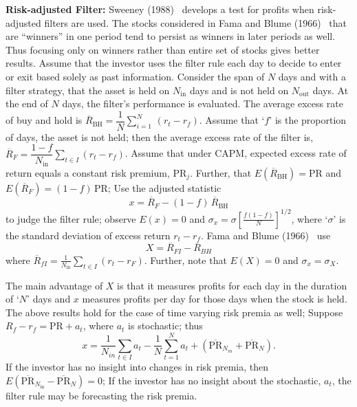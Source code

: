 \noindent \textbf{Risk-adjusted Filter:} Sweeney (1988)~\cite{sweet} develops a test for profits when risk-adjusted filters are used. The stocks considered in Fama and Blume (1966)~\cite{famablume} that are ``winners'' in one period tend to persist as winners in later periods as well. Thus focusing only on winners rather than entire set of stocks gives better results. Assume that the investor uses the filter rule each day to decide to enter or exit based solely as past information. Consider the span of $N$ days and with a filter strategy, that the asset is held on $N_{\text{in}}$ days and is not held on $N_{\text{out}}$ days. At the end of $N$ days, the filter's performance is evaluated. The average excess rate of buy and hold is $\overline{R}_{\text{BH}}=\dfrac{1}{N} \sum_{i=1}^N \, (r_t - r_f )$. Assume that `$f$' is the proportion of days, the asset is not held; then the average excess rate of the filter is, $\overline{R}_{F}=\dfrac{1-f}{N_{\text{in}}} \sum_{t \in I} (r_t - r_f)$. Assume that under CAPM, expected excess rate of return equals a constant risk premium, $\text{PR}_{j}$. Further, that $E(\overline{R}_{\text{BH}}) = \text{PR}$ and $E(\overline{R}_{F}) = (1 - f)\,\text{PR}$; Use the adjusted statistic
	\begin{equation} \label{eqn:xbarfirst}
	x= \overline{R}_{F} - (1 - f)\, \overline{R}_{\text{BH}}
	\end{equation}
to judge the filter rule; observe $E(x) = 0$ and $\sigma_{x} = \sigma[\frac{f(1-f)}{N}]^{1/2}$, where `$\sigma$' is the standard deviation of excess return $r_t - r_f$. Fama and Blume (1966)~\cite{famablume} use
	\begin{equation} \label{eqn:bigxbar}
	X = \overline{R}_{FI} - \overline{R}_{BH}
	\end{equation}
where $\overline{R}_{fI} = \frac{1}{N_{\text{in}}} \sum_{t \in I}(r_t - r_F)$. Further, note that $E(X) = 0$ and $\sigma_{x} = \sigma_{X}$.


The main advantage of $X$ is that it measures profits for each day in the duration of `$N$' days and $x$ measures profits per day for those days when the stock is held. The above results hold for the case of time varying risk premia as well; Suppose $R_f - r_f = \text{PR} + a_t$, where $a_t$ is stochastic; thus
	\begin{equation} \label{eqn:anotherxeq}
	x = \dfrac{1}{N_{in}} \sum_{t \in I} a_t - \dfrac{1}{N} \sum_{t=1}^N a_t + (\overline{\text{PR}}_{N_{in} }+\overline{\text{PR}}_N ).
	\end{equation}
If the investor has no insight into changes in risk premia, then $E(\overline{\text{PR}}_{N_{\text{in}}} - \overline{\text{PR}}_{N}) = 0$; If the investor has no insight about the stochastic, $a_t$, the filter rule may be forecasting the risk premia.


